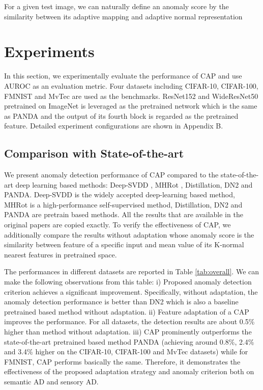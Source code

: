 \documentclass{article}
\begin{document}
For a given test image, we can naturally define an anomaly score by the similarity between its adaptive mapping  and adaptive normal representation 





\section{Experiments}

In this section, we experimentally evaluate the performance of CAP and use AUROC as an evaluation metric. Four datasets including CIFAR-10, CIFAR-100, FMNIST and MvTec are used as the benchmarks. ResNet152 and WideResNet50 pretrained on ImageNet is leveraged as the pretrained network which is the same as PANDA\cite{reiss2021panda} and the output of its fourth block is regarded as the pretrained feature. Detailed experiment configurations are shown in Appendix B.
 
 

\subsection{Comparison with State-of-the-art}

We present anomaly detection performance of CAP compared to the state-of-the-art deep learning based methods: Deep-SVDD \cite{ruff2018deep}, MHRot \cite{hendrycks2019using}, Distillation\cite{salehi2021multiresolution}, DN2 and PANDA\cite{reiss2021panda}. Deep-SVDD is the widely accepted deep-learning based method, MHRot is a high-performance self-supervised method, Distillation, DN2 and PANDA are pretrain based methods. All the results that are available in the original papers are copied exactly. To verify the effectiveness of CAP, we additionally compare the results without adaptation whose anomaly score is the similarity between feature of a specific input and mean value of its K-normal nearest features in pretrained space. 

The performances in different datasets are reported in Table \ref{tab:overall}. We can make the following observations from this table: i) Proposed anomaly detection criterion achieves a significant improvement. Specifically, without adaptation, the anomaly detection performance is better than DN2 which is also a baseline pretrained based method without adaptation. ii) Feature adaptation of a CAP improves the performance. For all datasets, the detection results are about 0.5\% higher than method without adaptation. iii) CAP prominently outperforms the state-of-the-art pretrained based method PANDA (achieving around 0.8\%, 2.4\% and 3.4\% higher on the CIFAR-10, CIFAR-100 and MvTec datasets) while for FMNIST, CAP performs basically the same. Therefore, it demonstrates the effectiveness of the proposed adaptation strategy and anomaly criterion both on semantic AD and sensory AD.
\end{document}
